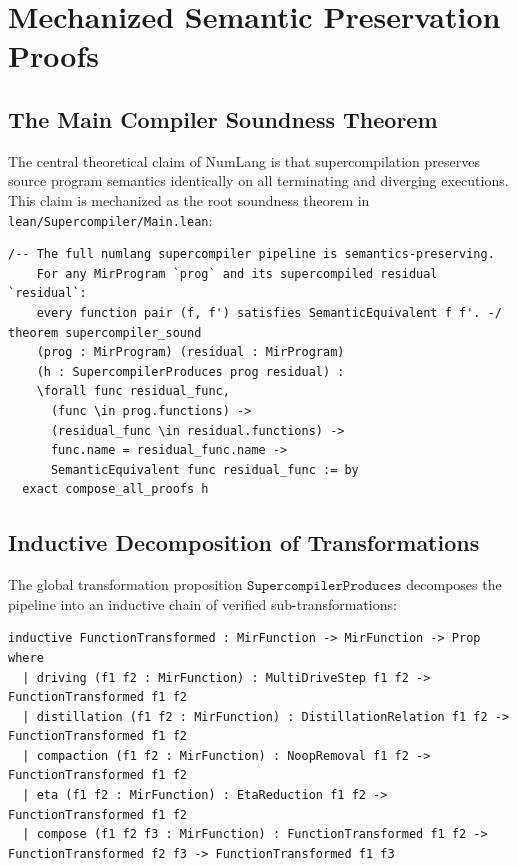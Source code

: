\chapter{Mechanized Semantic Preservation Proofs}
\label{chap:preservation}

\section{The Main Compiler Soundness Theorem}
\label{sec:preservation:main_theorem}

The central theoretical claim of NumLang is that supercompilation preserves source program semantics identically on all terminating and diverging executions. This claim is mechanized as the root soundness theorem in \texttt{lean/Supercompiler/Main.lean}:

\begin{lstlisting}[language=Lean4, caption={The root supercompiler\_sound theorem in Lean 4.}]
/-- The full numlang supercompiler pipeline is semantics-preserving.
    For any MirProgram `prog` and its supercompiled residual `residual`:
    every function pair (f, f') satisfies SemanticEquivalent f f'. -/
theorem supercompiler_sound
    (prog : MirProgram) (residual : MirProgram)
    (h : SupercompilerProduces prog residual) :
    \forall func residual_func,
      (func \in prog.functions) ->
      (residual_func \in residual.functions) ->
      func.name = residual_func.name ->
      SemanticEquivalent func residual_func := by
  exact compose_all_proofs h
\end{lstlisting}

\section{Inductive Decomposition of Transformations}
\label{sec:preservation:decomposition}

The global transformation proposition $\mathtt{SupercompilerProduces}$ decomposes the pipeline into an inductive chain of verified sub-transformations:

\begin{lstlisting}[language=Lean4, caption={Inductive transformation relations in Lean 4.}]
inductive FunctionTransformed : MirFunction -> MirFunction -> Prop where
  | driving (f1 f2 : MirFunction) : MultiDriveStep f1 f2 -> FunctionTransformed f1 f2
  | distillation (f1 f2 : MirFunction) : DistillationRelation f1 f2 -> FunctionTransformed f1 f2
  | compaction (f1 f2 : MirFunction) : NoopRemoval f1 f2 -> FunctionTransformed f1 f2
  | eta (f1 f2 : MirFunction) : EtaReduction f1 f2 -> FunctionTransformed f1 f2
  | compose (f1 f2 f3 : MirFunction) : FunctionTransformed f1 f2 -> FunctionTransformed f2 f3 -> FunctionTransformed f1 f3
\end{lstlisting}

